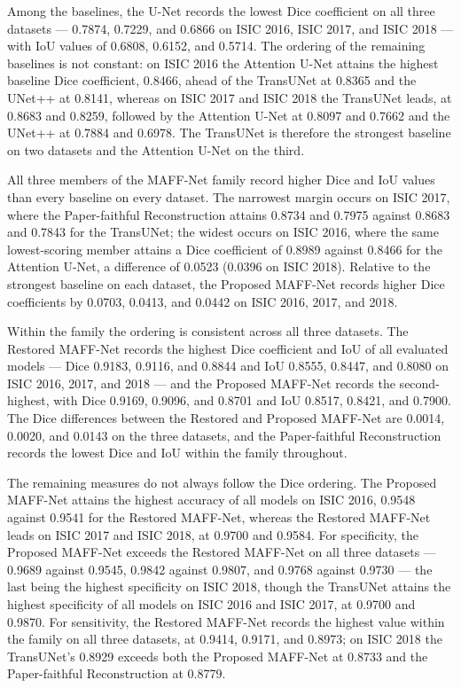 Among the baselines, the U-Net records the lowest Dice coefficient on all three datasets --- 0.7874, 0.7229, and 0.6866 on ISIC 2016, ISIC 2017, and ISIC 2018 --- with IoU values of 0.6808, 0.6152, and 0.5714. The ordering of the remaining baselines is not constant: on ISIC 2016 the Attention U-Net attains the highest baseline Dice coefficient, 0.8466, ahead of the TransUNet at 0.8365 and the UNet++ at 0.8141, whereas on ISIC 2017 and ISIC 2018 the TransUNet leads, at 0.8683 and 0.8259, followed by the Attention U-Net at 0.8097 and 0.7662 and the UNet++ at 0.7884 and 0.6978. The TransUNet is therefore the strongest baseline on two datasets and the Attention U-Net on the third.

All three members of the MAFF-Net family record higher Dice and IoU values than every baseline on every dataset. The narrowest margin occurs on ISIC 2017, where the Paper-faithful Reconstruction attains 0.8734 and 0.7975 against 0.8683 and 0.7843 for the TransUNet; the widest occurs on ISIC 2016, where the same lowest-scoring member attains a Dice coefficient of 0.8989 against 0.8466 for the Attention U-Net, a difference of 0.0523 (0.0396 on ISIC 2018). Relative to the strongest baseline on each dataset, the Proposed MAFF-Net records higher Dice coefficients by 0.0703, 0.0413, and 0.0442 on ISIC 2016, 2017, and 2018.

Within the family the ordering is consistent across all three datasets. The Restored MAFF-Net records the highest Dice coefficient and IoU of all evaluated models --- Dice 0.9183, 0.9116, and 0.8844 and IoU 0.8555, 0.8447, and 0.8080 on ISIC 2016, 2017, and 2018 --- and the Proposed MAFF-Net records the second-highest, with Dice 0.9169, 0.9096, and 0.8701 and IoU 0.8517, 0.8421, and 0.7900. The Dice differences between the Restored and Proposed MAFF-Net are 0.0014, 0.0020, and 0.0143 on the three datasets, and the Paper-faithful Reconstruction records the lowest Dice and IoU within the family throughout.

The remaining measures do not always follow the Dice ordering. The Proposed MAFF-Net attains the highest accuracy of all models on ISIC 2016, 0.9548 against 0.9541 for the Restored MAFF-Net, whereas the Restored MAFF-Net leads on ISIC 2017 and ISIC 2018, at 0.9700 and 0.9584. For specificity, the Proposed MAFF-Net exceeds the Restored MAFF-Net on all three datasets --- 0.9689 against 0.9545, 0.9842 against 0.9807, and 0.9768 against 0.9730 --- the last being the highest specificity on ISIC 2018, though the TransUNet attains the highest specificity of all models on ISIC 2016 and ISIC 2017, at 0.9700 and 0.9870. For sensitivity, the Restored MAFF-Net records the highest value within the family on all three datasets, at 0.9414, 0.9171, and 0.8973; on ISIC 2018 the TransUNet's 0.8929 exceeds both the Proposed MAFF-Net at 0.8733 and the Paper-faithful Reconstruction at 0.8779.


